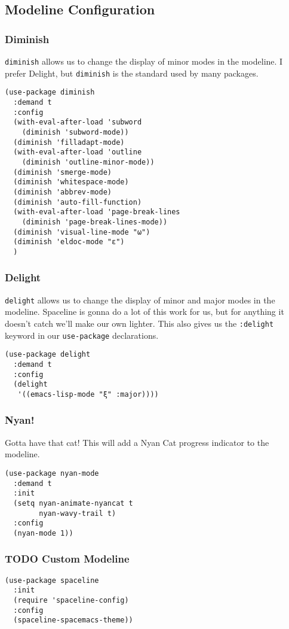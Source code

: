 \documentclass[11pt]{article}
\begin{document}
\subsection{Modeline Configuration}
\label{sec:org22bbe51}
\subsubsection{Diminish}
\label{sec:orgd13c7cd}
\texttt{diminish} allows us to change the display of minor modes in the
modeline. I prefer Delight, but \texttt{diminish} is the standard used by
many packages.
\begin{verbatim}
(use-package diminish
  :demand t
  :config
  (with-eval-after-load 'subword
    (diminish 'subword-mode))
  (diminish 'filladapt-mode)
  (with-eval-after-load 'outline
    (diminish 'outline-minor-mode))
  (diminish 'smerge-mode)
  (diminish 'whitespace-mode)
  (diminish 'abbrev-mode)
  (diminish 'auto-fill-function)
  (with-eval-after-load 'page-break-lines
    (diminish 'page-break-lines-mode))
  (diminish 'visual-line-mode "ω")
  (diminish 'eldoc-mode "ε")
  )
\end{verbatim}
\subsubsection{Delight}
\label{sec:orgfe623aa}
\texttt{delight} allows us to change the display of minor and major modes in
the modeline. Spaceline is gonna do a lot of this work for us, but for
anything it doesn't catch we'll make our own lighter. This also gives
us the \texttt{:delight} keyword in our \texttt{use-package} declarations.

\begin{verbatim}
(use-package delight
  :demand t
  :config
  (delight
   '((emacs-lisp-mode "ξ" :major))))
\end{verbatim}
\subsubsection{Nyan!}
\label{sec:org6a1934f}
Gotta have that cat! This will add a Nyan Cat progress indicator to
the modeline.
\begin{verbatim}
(use-package nyan-mode
  :demand t
  :init
  (setq nyan-animate-nyancat t
        nyan-wavy-trail t)
  :config
  (nyan-mode 1))
\end{verbatim}
\subsubsection{{\bfseries\sffamily TODO} Custom Modeline}
\label{sec:org0989972}
\begin{verbatim}
(use-package spaceline
  :init
  (require 'spaceline-config)
  :config
  (spaceline-spacemacs-theme))
\end{verbatim}
\end{document}

